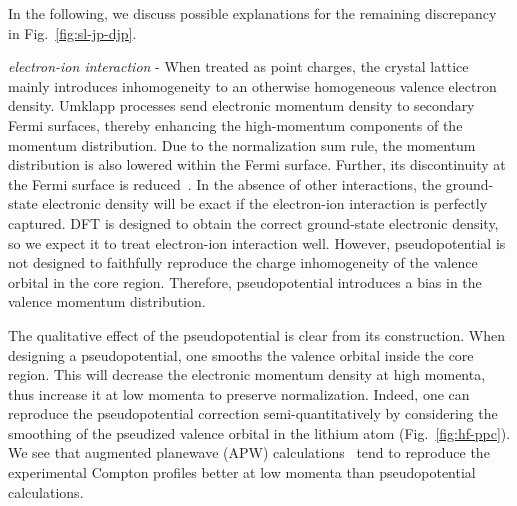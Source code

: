 \documentclass[aps,prb,showpacs,preprintnumbers,amsmath,amssymb,superscriptaddress,twocolumn]{revtex4-1}
\begin{document}
In the following, we discuss possible explanations for the remaining discrepancy in Fig.~\ref{fig:sl-jp-djp}. %

\emph{electron-ion interaction} - When treated as point charges, the crystal lattice mainly introduces inhomogeneity to an otherwise homogeneous valence electron density. Umklapp processes send electronic momentum density to secondary Fermi surfaces, thereby enhancing the high-momentum components of the momentum distribution. Due to the normalization sum rule, the momentum distribution is also lowered within the Fermi surface. Further, its discontinuity at the Fermi surface is reduced~\cite{P.EisenbergerL.LamP.M.Platzman1972}. In the absence of other interactions, the ground-state electronic density will be exact if the electron-ion interaction is perfectly captured. DFT is designed to obtain the correct ground-state electronic density, so we expect it to treat electron-ion interaction well. However, pseudopotential is not designed to faithfully reproduce the charge inhomogeneity of the valence orbital in the core region. Therefore, pseudopotential introduces a bias in the valence momentum distribution.

The qualitative effect of the pseudopotential is clear from its construction. When designing a pseudopotential, one smooths the valence orbital inside the core region. This will decrease the electronic momentum density at high momenta, thus increase it at low momenta to preserve normalization. Indeed, one can reproduce the pseudopotential correction semi-quantitatively by considering the smoothing of the pseudized valence orbital in the lithium atom (Fig.~\ref{fig:hf-ppc}). We see that augmented planewave (APW) calculations~\cite{Baruah1999,Bross2004,Bross2005,Bross2012} tend to reproduce the experimental Compton profiles better at low momenta than pseudopotential calculations.
\end{document}
